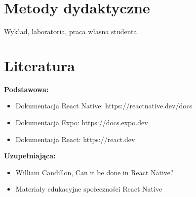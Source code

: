 \documentclass[12pt, a4paper]{article}
\begin{document}
\section{Metody dydaktyczne}

Wykład, laboratoria, praca własna studenta.

\section{Literatura}

\textbf{Podstawowa:}
\begin{itemize}
  \item Dokumentacja React Native: https://reactnative.dev/docs
  \item Dokumentacja Expo: https://docs.expo.dev
  \item Dokumentacja React: https://react.dev
\end{itemize}

\textbf{Uzupełniająca:}
\begin{itemize}
  \item William Candillon, Can it be done in React Native?
  \item Materiały edukacyjne społeczności React Native
\end{itemize}
\end{document}
